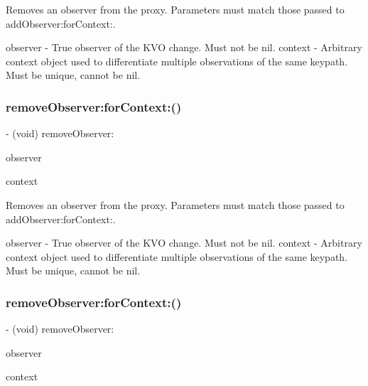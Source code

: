 Removes an observer from the proxy. Parameters must match those passed to add\+Observer\+:for\+Context\+:.

observer -\/ True observer of the K\+VO change. Must not be nil. context -\/ Arbitrary context object used to differentiate multiple observations of the same keypath. Must be unique, cannot be nil. \mbox{\label{interface_r_a_c_k_v_o_proxy_a1b7a8cc1af60353400c05976d9078d73}} 
\subsubsection{\texorpdfstring{remove\+Observer\+:for\+Context\+:()}{removeObserver:forContext:()}\hspace{0.1cm}{\footnotesize\ttfamily [2/3]}}
{\footnotesize\ttfamily -\/ (void) remove\+Observer\+: \begin{DoxyParamCaption}\item[{(N\+S\+Object $\ast$)}]{observer }\item[{forContext:(void $\ast$)}]{context }\end{DoxyParamCaption}}

Removes an observer from the proxy. Parameters must match those passed to add\+Observer\+:for\+Context\+:.

observer -\/ True observer of the K\+VO change. Must not be nil. context -\/ Arbitrary context object used to differentiate multiple observations of the same keypath. Must be unique, cannot be nil. \mbox{\label{interface_r_a_c_k_v_o_proxy_a1b7a8cc1af60353400c05976d9078d73}} 
\subsubsection{\texorpdfstring{remove\+Observer\+:for\+Context\+:()}{removeObserver:forContext:()}\hspace{0.1cm}{\footnotesize\ttfamily [3/3]}}
{\footnotesize\ttfamily -\/ (void) remove\+Observer\+: \begin{DoxyParamCaption}\item[{(N\+S\+Object $\ast$)}]{observer }\item[{forContext:(void $\ast$)}]{context }\end{DoxyParamCaption}}

